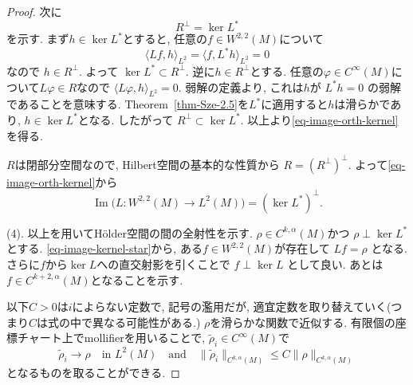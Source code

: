 \documentclass[dvipdfmx,a4paper,11pt]{article} %
\theoremstyle{definition}
\theoremstyle{remark}
\numberwithin{equation}{section}
\begin{document}
\begin{proof}
次に
\begin{equation}
\label{eq-image-orth-kernel}
R^\perp=\ker L^*
\end{equation}
を示す. 
まず$h\in\ker L^*$とすると, 任意の$f\in W^{2,2}(M)$について
\[
\langle Lf,h\rangle_{L^2}
=
\langle f,L^*h\rangle_{L^2}
=0
\]
なので
\(
h\in R^\perp.
\)
よって
\(
\ker L^*\subset R^\perp.
\)
逆に$h\in R^\perp$とする. 
任意の$\varphi\in C^\infty(M)$について$L\varphi\in R$なので
\(
\langle L\varphi,h\rangle_{L^2}=0.
\)
弱解の定義より, これは$h$が
\(
L^*h=0
\)
の弱解であることを意味する. 
Theorem~\ref{thm-Sze-2.5}を$L^*$に適用すると$h$は滑らかであり, 
$h\in\ker L^*$となる. 
したがって
\(
R^\perp\subset\ker L^*.
\)
以上より\eqref{eq-image-orth-kernel}を得る. 

$R$は閉部分空間なので, Hilbert空間の基本的な性質から
\(
R=(R^\perp)^\perp.
\)
よって\eqref{eq-image-orth-kernel}から
\begin{equation}
\label{eq-image-kernel-star}
\operatorname{Im}
\bigl(
L\colon W^{2,2}(M)\to L^2(M)
\bigr)
=
(\ker L^*)^\perp.
\end{equation}


(4). 以上を用いてH\"older空間の間の全射性を示す. 
$\rho\in C^{k,\alpha}(M)$かつ
\(
\rho\perp\ker L^*
\)
とする. 
\eqref{eq-image-kernel-star}から, ある$f\in W^{2,2}(M)$が存在して
\(
Lf=\rho
\)
となる. 
さらに$f$から$\ker L$への直交射影を引くことで
\(
f\perp\ker L
\)
として良い. 
あとは$f\in C^{k+2,\alpha}(M)$となることを示す. 

以下$C>0$は$i$によらない定数で, 記号の濫用だが, 適宜定数を取り替えていく(つまり$C$は式の中で異なる可能性がある.)
$\rho$を滑らかな関数で近似する. 
有限個の座標チャート上でmollifierを用いることで, 
$\widetilde\rho_i\in C^\infty(M)$で
\[
\widetilde\rho_i\to\rho
\quad\text{in }L^2(M)
\quad \text{and} \quad 
\lVert\widetilde\rho_i\rVert_{C^{k,\alpha}(M)}
\leq
C\lVert\rho\rVert_{C^{k,\alpha}(M)}
\]
となるものを取ることができる. 


\end{proof}
\end{document}

